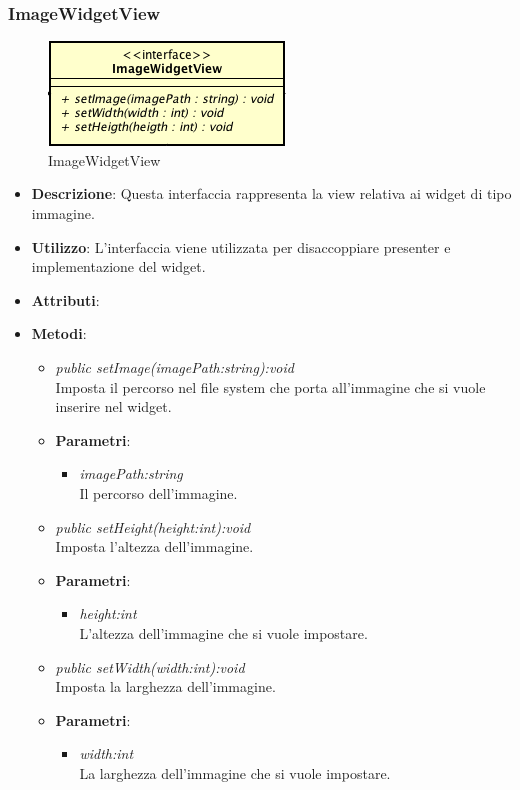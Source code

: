 \subsubsection{ImageWidgetView}

\label{ImageWidgetView}
\begin{figure}[ht]
	\centering
	\includegraphics[scale=0.5]{Sezioni/SottosezioniST/img/ImageWidgetView.png}
	\caption{ImageWidgetView}
\end{figure}

\begin{itemize}
\item \textbf{Descrizione}: Questa interfaccia rappresenta la view relativa ai widget di tipo immagine.
\item \textbf{Utilizzo}: L'interfaccia viene utilizzata per disaccoppiare presenter e implementazione del widget.
\item \textbf{Attributi}:
\item \textbf{Metodi}:
	\begin{itemize}
	\item \textit{public setImage(imagePath:string):void}\\
	Imposta il percorso nel file system che porta all'immagine che si vuole inserire nel widget.
		\item{\textbf{Parametri}: \begin{itemize}
		\item \textit{imagePath:string}\\
		Il percorso dell'immagine.
		\end{itemize}}
	\item \textit{public setHeight(height:int):void}\\
	Imposta l'altezza dell'immagine.
		\item{\textbf{Parametri}: \begin{itemize}
		\item \textit{height:int}\\
		L'altezza dell'immagine che si vuole impostare.
		\end{itemize}}
	\item \textit{public setWidth(width:int):void}\\
	Imposta la larghezza dell'immagine.
		\item{\textbf{Parametri}: \begin{itemize}
		\item \textit{width:int}\\
		La larghezza dell'immagine che si vuole impostare.
		\end{itemize}}
	\end{itemize}
\end{itemize}

